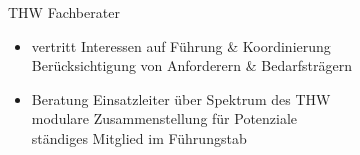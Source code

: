 \begin{warningbox}{THW Fachberater}
    \begin{itemize}
        \item vertritt Interessen auf Führung \& Koordinierung\\
        \ra Berücksichtigung von Anforderern \& Bedarfsträgern
        \item Beratung Einsatzleiter über Spektrum des THW\\
        \ra modulare Zusammenstellung für Potenziale\\
        \ra ständiges Mitglied im Führungstab
    \end{itemize}
\end{warningbox}
